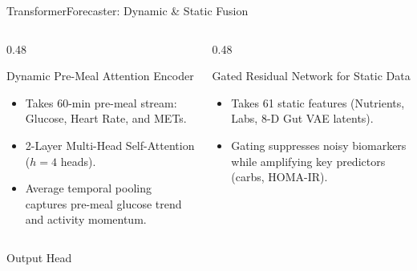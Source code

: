 \documentclass[aspectratio=169, 10pt]{beamer}
\begin{document}
\begin{frame}{TransformerForecaster: Dynamic \& Static Fusion}
  \begin{columns}[c]
    \begin{column}{0.48\textwidth}
      \begin{block}{Dynamic Pre-Meal Attention Encoder}
        \begin{itemize}\setlength{\itemsep}{0.4em}
          \item Takes 60-min pre-meal stream: Glucose, Heart Rate, and METs.
          \item 2-Layer Multi-Head Self-Attention ($h=4$ heads).
          \item Average temporal pooling captures pre-meal glucose trend and activity momentum.
        \end{itemize}
      \end{block}
    \end{column}
    
    \begin{column}{0.48\textwidth}
      \begin{block}{Gated Residual Network for Static Data}
        \begin{itemize}\setlength{\itemsep}{0.4em}
          \item Takes 61 static features (Nutrients, Labs, 8-D Gut VAE latents).
          \item Gating suppresses noisy biomarkers while amplifying key predictors (carbs, HOMA-IR).
        \end{itemize}
      \end{block}
    \end{column}
  \end{columns}
  
  \vspace{0.3cm}
  \begin{exampleblock}{\centering Output Head}
  \end{exampleblock}
\end{frame}
\end{document}
